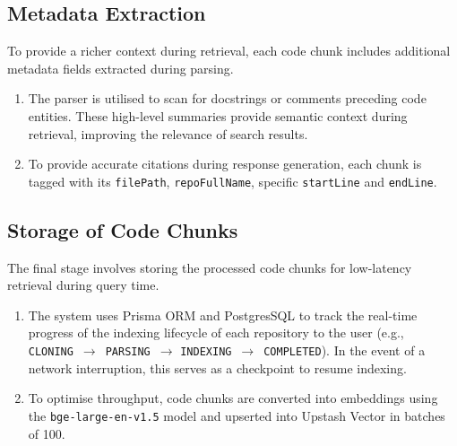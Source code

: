 \subsection{Metadata Extraction}
To provide a richer context during retrieval, each code chunk includes additional metadata fields extracted during parsing.
\begin{enumerate}
    \item The parser is utilised to scan for docstrings or comments preceding code entities. These high-level summaries provide semantic context during retrieval, improving the relevance of search results.
    \item To provide accurate citations during response generation, each chunk is tagged with its \texttt{filePath}, \texttt{repoFullName}, specific \texttt{startLine} and \texttt{endLine}.
\end{enumerate}

\subsection{Storage of Code Chunks}
The final stage involves storing the processed code chunks for low-latency retrieval during query time.
\begin{enumerate}
    \item The system uses Prisma ORM and PostgresSQL to track the real-time progress of the indexing lifecycle of each repository to the user (e.g., \texttt{CLONING}~$\rightarrow$~\texttt{PARSING}~$\rightarrow$ \allowbreak \texttt{INDEXING}~$\rightarrow$~\texttt{COMPLETED}). In the event of a network interruption, this serves as a checkpoint to resume indexing.
    \item To optimise throughput, code chunks are converted into embeddings using the \texttt{bge-large-en-v1.5} model and upserted into Upstash Vector in batches of 100.
\end{enumerate}

